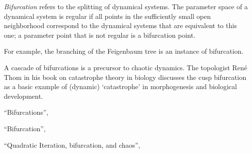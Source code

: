 \documentclass[12pt]{article}
\begin{document}
\emph{Bifurcation} refers to the splitting of dynamical systems. The parameter space of a dynamical system is regular if all points in the sufficiently small open neighborhood correspond to the dynamical systems that are equivalent to this one; a parameter point that is not regular is a bifurcation point.

For example, the branching of the Feigenbaum tree is an instance of bifurcation.

A cascade of bifurcations is a precursor to chaotic dynamics.
The topologist Ren\'e Thom in his book on catastrophe theory in biology discusses the cusp bifurcation
as a basic example of (dynamic) `catastrophe' in morphogenesis and biological development. 

\begin{thebibliography}{3}

 ``Bifurcations'', 

 ``Bifurcation'', 

 ``Quadratic Iteration, bifurcation, and chaos'', 

\end{thebibliography}
\end{document}
